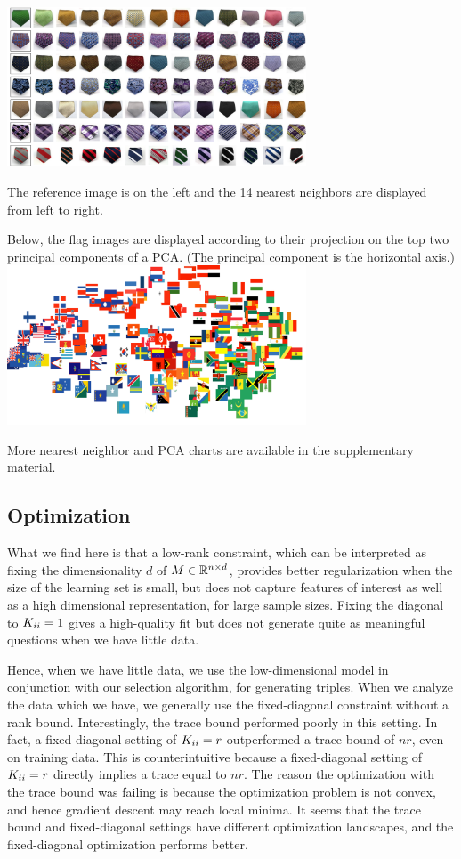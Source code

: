 \documentclass{article}
\begin{document}
{\center \includegraphics[width=3.5in]{neckties_neighs.pdf}}

The reference image is on the left and the 14 nearest neighbors are displayed from left to right.

Below, the flag images are displayed according to their projection on
the top two principal components of a PCA.  (The principal component
is the horizontal axis.)
{\center \includegraphics[width=3.5in]{flags_pca.pdf}}

More nearest neighbor and PCA charts are available in the
supplementary material.


\subsection{Optimization}


What we find here is that a low-rank constraint, which can be
interpreted as fixing the dimensionality $d$ of $M \in \reals^{n
  \times d}$, provides better regularization when the size of the
learning set is small, but does not capture features of interest as
well as a high dimensional representation, for large sample sizes.
Fixing the diagonal to $\S_{ii}=1$ gives a high-quality fit but does
not generate quite as meaningful questions when we have little data.

Hence, when we have little data, we use the low-dimensional model in
conjunction with our selection algorithm, for generating triples.
When we analyze the data which we have, we generally use the
fixed-diagonal constraint without a rank bound.  Interestingly, the
trace bound performed poorly in this setting.  In fact, a
fixed-diagonal setting of $\S_{ii}=r$ outperformed a trace bound of
$nr$, even on training data.  This is counterintuitive because a
fixed-diagonal setting of $\S_{ii}=r$ directly implies a trace equal
to $nr$.  The reason the optimization with the trace bound was failing
is because the optimization problem is not convex, and hence gradient
descent may reach local minima.  It seems that the trace bound and
fixed-diagonal settings have different optimization landscapes, and
the fixed-diagonal optimization performs better.
\end{document}
